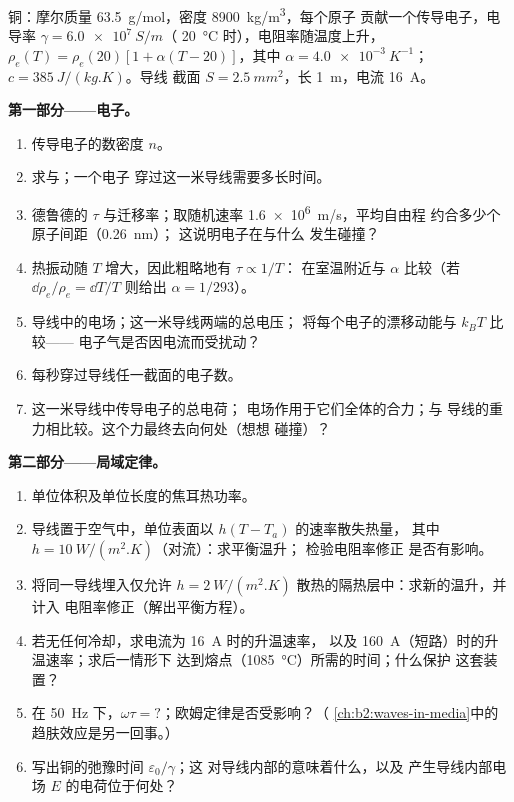 \begin{problem}
\label{pb:b2:charges-currents-conduction:1}

铜：摩尔质量 \qty{63.5}{g/mol}，密度 \qty{8900}{kg/m^3}，每个原子
贡献一个传导电子，电导率 $\gamma = \qty{6.0e7}{S/m}$（
\qty{20}{\degreeCelsius} 时），电阻率随温度上升，$\rho_e(T) = \rho_e(20)[1 +
\alpha(T - 20)]$，其中 $\alpha = \qty{4.0e-3}{K^{-1}}$；$c = \qty{385}{J/(kg.K)}$。导线
截面 $S = \qty{2.5}{mm^2}$，长 \qty{1}{m}，电流 \qty{16}{A}。

\medskip
\noindent\textbf{第一部分——电子。}
\begin{enumerate}
  \item 传导电子的数密度 $n$。
  \item 求与；一个电子
        穿过这一米导线需要多长时间。
  \item 德鲁德的 $\tau$ 与迁移率；取随机速率 \qty{1.6e6}{m/s}，平均自由程
        约合多少个原子间距（\qty{0.26}{nm}）；
        这说明电子在与什么
        发生碰撞？
  \item 热振动随 $T$ 增大，因此粗略地有 $\tau \propto 1/T$：
        在室温附近与 $\alpha$ 比较（若 $\dd\rho_e/\rho_e =
        \dd T/T$ 则给出 $\alpha = 1/293$）。
  \item 导线中的电场；这一米导线两端的总电压；
        将每个电子的漂移动能与 $k_BT$ 比较——
        电子气是否因电流而受扰动？
  \item 每秒穿过导线任一截面的电子数。
  \item 这一米导线中传导电子的总电荷；
        电场作用于它们全体的合力；与
        导线的重力相比较。这个力最终去向何处（想想
        碰撞）？
\end{enumerate}

\medskip
\noindent\textbf{第二部分——局域定律。}
\begin{enumerate}[resume]
  \item 单位体积及单位长度的焦耳热功率。
  \item 导线置于空气中，单位表面以 $h(T - T_a)$ 的速率散失热量，
        其中 $h = \qty{10}{W/(m^2.K)}$（对流）：求平衡温升；
        检验电阻率修正
        是否有影响。
  \item 将同一导线埋入仅允许 $h =
        \qty{2}{W/(m^2.K)}$ 散热的隔热层中：求新的温升，并计入
        电阻率修正（解出平衡方程）。
  \item 若无任何冷却，求电流为 \qty{16}{A} 时的升温速率，
        以及 \qty{160}{A}（短路）时的升温速率；求后一情形下
        达到熔点（\qty{1085}{\degreeCelsius}）所需的时间；什么保护
        这套装置？
  \item 在 \qty{50}{Hz} 下，$\omega\tau = ?$；欧姆定律是否受影响？（
        \cref{ch:b2:waves-in-media}中的趋肤效应是另一回事。）
  \item 写出铜的弛豫时间 $\varepsilon_0/\gamma$；这
        对导线内部的意味着什么，以及
        产生导线内部电场 $E$ 的电荷位于何处？
\end{enumerate}


\end{problem}
